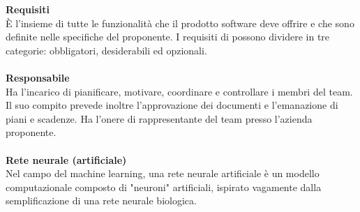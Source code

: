 \textbf{Requisiti}\\
È l'insieme di tutte le funzionalità che il prodotto software deve offrire e che sono definite nelle specifiche del proponente. I requisiti di possono dividere in tre categorie: obbligatori, desiderabili ed opzionali.\\ \\
\textbf{Responsabile}\\
Ha l'incarico di pianificare, motivare, coordinare e controllare i membri del team. Il suo compito prevede inoltre l'approvazione dei documenti e l'emanazione di piani e scadenze. Ha l'onere di rappresentante del team presso l'azienda proponente. \\ \\
\textbf{Rete neurale (artificiale)}\\
Nel campo del machine learning, una rete neurale artificiale è un modello computazionale composto di "neuroni" artificiali, ispirato vagamente dalla semplificazione di una rete neurale biologica. \\ \\
\clearpage